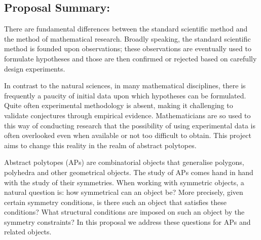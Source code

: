 \subsection*{Proposal Summary:}



% 

There are fundamental differences between the standard scientific method and the method of mathematical research. Broadly speaking, the standard scientific method is founded upon observations; these observations  are eventually used to formulate hypotheses and those are then confirmed or rejected based on carefully design experiments. 

In contrast to the natural sciences, in many mathematical disciplines, 
there is frequently a paucity of initial data upon which hypotheses can be formulated. 
Quite often experimental methodology is absent, making it challenging to validate conjectures through empirical evidence. Mathematicians are so used to this way of conducting research that the possibility of using experimental data is often overlooked even when available or not too difficult to obtain. This project aims to change this reality in the realm of abstract polytopes.

Abstract polytopes (APs) are combinatorial objects that generalise polygons, polyhedra and other geometrical objects. The study of APs comes hand in hand with the study of their symmetries. When working with symmetric objects, a natural question is: how symmetrical can an object be? More precisely, given certain symmetry conditions, is there such an object that satisfies these conditions? What structural conditions are imposed on such an object by the symmetry constraints? In this proposal we address these questions for APs and related objects.  

